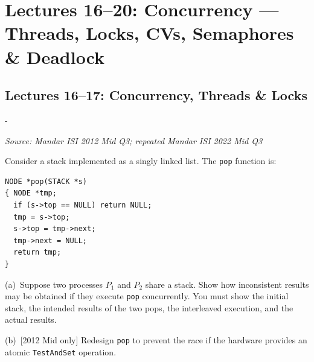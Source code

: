 \documentclass[11pt,a4paper]{article}
\makeatletter
\newcommand{\keepspace}[1]{\par\penalty-100\begingroup
  \setlength{\dimen@}{#1}\dimen@ii\pagegoal\advance\dimen@ii-\pagetotal
  \ifdim\dimen@>\dimen@ii\ifdim\dimen@ii>\z@\vfil\fi\break\fi\endgroup}
\newcounter{qn}[section]
\newenvironment{Qn}[4]{%
  \refstepcounter{qn}\keepspace{7\baselineskip}%
  \begin{tcolorbox}[qboxstyle, title={Q\thesection.\theqn\ \ [#1 \textbar\ #2]\ \ #4}]%
  {\footnotesize\color{g3}\textit{Source: #3}}\par\smallskip%
}{%
  \end{tcolorbox}%
}
\makeatother
\begin{document}
\clearpage

\section{Lectures 16--20: Concurrency --- Threads, Locks, CVs, Semaphores \& Deadlock}

\subsection{Lectures 16--17: Concurrency, Threads \& Locks}

\begin{Qn}{Hard}{Lect 17}{Mandar ISI 2012 Mid Q3; repeated Mandar ISI 2022 Mid Q3}{Concurrent \texttt{pop} on a shared linked-list stack}
Consider a stack implemented as a singly linked list. The \texttt{pop} function is:

\begin{lstlisting}[numbers=none]
NODE *pop(STACK *s)
{ NODE *tmp;
  if (s->top == NULL) return NULL;
  tmp = s->top;
  s->top = tmp->next;
  tmp->next = NULL;
  return tmp;
}
\end{lstlisting}

(a)~Suppose two processes $P_1$ and $P_2$ share a stack. Show how inconsistent results may be obtained if they execute \texttt{pop} concurrently. You must show the initial stack, the intended results of the two pops, the interleaved execution, and the actual results.

(b)~[2012 Mid only] Redesign \texttt{pop} to prevent the race if the hardware provides an atomic \texttt{TestAndSet} operation.
\end{Qn}
\end{document}
